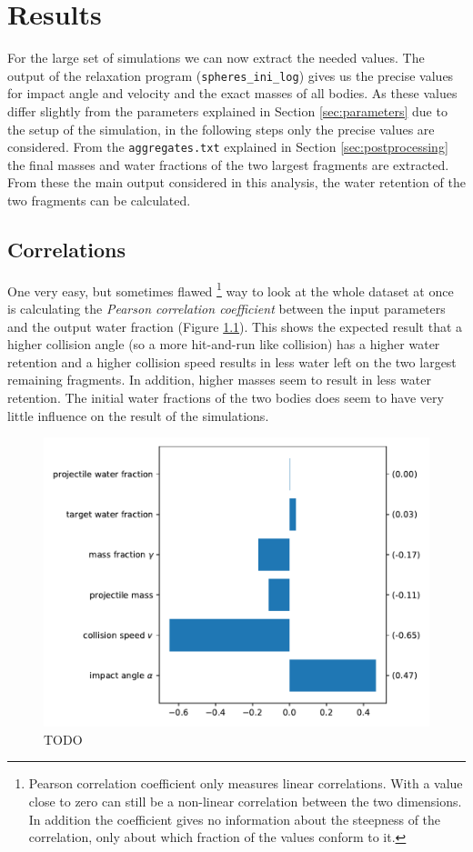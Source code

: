\chapter{Results}
\label{chapter:results}

For the large set of simulations we can now extract the needed values. The output of the relaxation program (\texttt{spheres\_ini\_log}) gives us the precise values for impact angle and velocity and the exact masses of all bodies. As these values differ slightly from the parameters explained in Section \ref{sec:parameters} due to the setup of the simulation, in the following steps only the precise values are considered. From the \texttt{aggregates.txt} explained in Section \ref{sec:postprocessing} the final masses and water fractions of the two largest fragments are extracted. From these the main output considered in this analysis, the water retention of the two fragments can be calculated. 

\section{Correlations}
\label{sec:cov}
One very easy, but sometimes flawed%
\footnote{Pearson correlation coefficient only measures linear correlations. With a value close to zero can still be a non-linear correlation between the two dimensions. In addition the coefficient gives no information about the steepness of the correlation, only about which fraction of the values conform to it.} 
way to look at the whole dataset at once is calculating the \textit{Pearson correlation coefficient} between the input parameters and the output water fraction (Figure \ref{fig:cov}). This shows the expected result that a higher collision angle (so a more hit-and-run like collision) has a higher water retention and a higher collision speed results in less water left on the two largest remaining fragments. In addition, higher masses seem to result in less water retention. The initial water fractions of the two bodies does seem to have very little influence on the result of the simulations.

\begin{figure}
	\centering
	\includegraphics[width=0.8\linewidth]{images/cov.pdf}
	\caption{TODO}
	\label{fig:cov}
\end{figure}